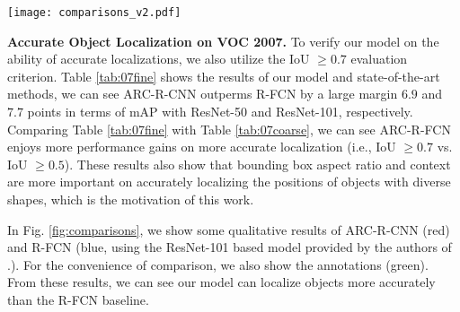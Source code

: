 \documentclass[10pt,twocolumn,letterpaper]{article}
\begin{document}
\begin{table*} 
\begin{center}
\end{center}
\caption{mAP results with IoU $\ge 0.7$ of ARC-R-CNN and state-of-the-art models on PASCAL VOC 2007 test set.}
\label{tab:07fine} 
\vspace{-3mm}
\end{table*}

\begin{figure*}
\centering
{\texttt{[image: comparisons\_v2.pdf]}}
\caption{Sample detections of ARC-R-CNN-Res101 (red) and R-FCN-Res101 \cite{rfcn} (blue). For comparison, we also show the groundtruth bounding box (green). The score threshold is set to $0.6$ for good visualization. Best viewed in color and zoom in. \vspace{-5mm} }
\label{fig:comparisons}
\vspace{-1mm}
\end{figure*} 

\textbf{Accurate Object Localization on VOC 2007.} To verify our model on the ability of accurate localizations, we also utilize the IoU $\ge 0.7$ evaluation criterion.
Table \ref{tab:07fine} shows the results of our model and state-of-the-art methods, we can see ARC-R-CNN outperms R-FCN by a large margin $6.9$ and $7.7$ points in terms of mAP with ResNet-50 and ResNet-101, respectively. 
Comparing Table \ref{tab:07fine} with Table \ref{tab:07coarse}, we can see ARC-R-FCN enjoys more performance gains on more accurate localization (i.e., IoU $\ge 0.7$ vs. IoU $\ge 0.5$).
These results also show that bounding box aspect ratio and context are more important on accurately localizing the positions of objects with diverse shapes, which is the motivation of this work.

In Fig. \ref{fig:comparisons}, we show some qualitative results of ARC-R-CNN (red) and R-FCN (blue, using the ResNet-101 based model provided by the authors of \cite{rfcn}.). For the convenience of comparison, we also show the annotations (green). From these results, we can see our model can localize objects more accurately than the R-FCN baseline.
\end{document}
